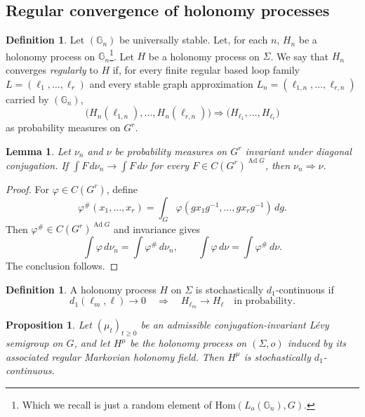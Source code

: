 \documentclass[11pt,a4paper,reqno]{article}
\newtheorem{lemma}[theorem]{Lemma}
\newtheorem{proposition}[theorem]{Proposition}
\theoremstyle{definition}
\newtheorem{definition}[theorem]{Definition}
\theoremstyle{remark}
\newcommand\Hom{\mathrm{Hom}}
\newcommand\Gbb{{\mathbb{G}}}
\begin{document}
\subsection{Regular convergence of holonomy processes}

\begin{definition}\label{def:regular-process-convergence}
Let $(\Gbb_n)$ be universally stable. Let, for each $n$, $H_n$ be a holonomy process on $\Gbb_n$\footnote{Which we recall is just a random element of $\Hom(L_o(\Gbb_n),G)$.}. Let $H$ be a holonomy process on $\Sigma$. We say that $H_n$ converges \emph{regularly} to $H$ if, for every finite regular based loop family $L=(\ell_1,\ldots,\ell_r)$ and every stable graph approximation $L_n=(\ell_{1,n},\ldots,\ell_{r,n})$ carried by $(\Gbb_n)$,
\[
 \bigl(H_n(\ell_{1,n}),\ldots,H_n(\ell_{r,n})\bigr)
 \Longrightarrow
 \bigl(H_{\ell_1},\ldots,H_{\ell_r}\bigr)
\]
as probability measures on $G^r$.
\end{definition}

\begin{lemma}\label{lem:invariant-tests-determine-weak-convergence}
Let $\nu_n$ and $\nu$ be probability measures on $G^r$ invariant under diagonal conjugation. If $\int F\,d\nu_n\rightarrow\int F\,d\nu$ for every $F\in C(G^r)^{\operatorname{Ad}G}$, then $\nu_n\Rightarrow\nu$.
\end{lemma}

\begin{proof}
For $\varphi\in C(G^r)$, define
\[
\varphi^\#(x_1,\ldots,x_r) = \int_G\varphi(gx_1g^{-1},\ldots,gx_rg^{-1})\,dg.
\]
Then $\varphi^\#\in C(G^r)^{\operatorname{Ad}G}$ and invariance gives
\[
\int\varphi\,d\nu_n=\int\varphi^\#\,d\nu_n,\qquad\int\varphi\,d\nu=\int\varphi^\#\,d\nu.
\]
The conclusion follows.
\end{proof}

\begin{definition}\label{def:stochastic-d1-continuity}
A holonomy process $H$ on $\Sigma$ is stochastically $d_1$-continuous if
\[
 d_1(\ell_m,\ell)\longrightarrow0
 \quad\Longrightarrow\quad
 H_{\ell_m}\longrightarrow H_\ell
 \quad\text{in probability}.
\]
\end{definition}

\begin{proposition}\label{prop:Levy-stoch-d1-continuity}
Let $(\mu_t)_{t\ge0}$ be an admissible conjugation-invariant L\'evy semigroup on $G$, and let $H^\mu$ be the holonomy process on $(\Sigma,o)$ induced by its associated regular Markovian holonomy field. Then $H^\mu$ is stochastically $d_1$-continuous.
\end{proposition}
\end{document}
